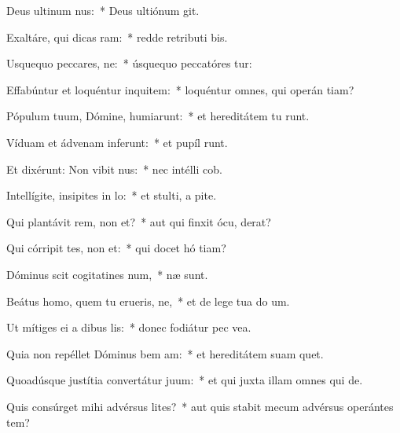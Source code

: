 \item Deus ultinum nus:~* Deus ultiónum  git.
\item Exaltáre, qui dicas ram:~* redde retributi bis.
\item Usquequo peccares, ne:~* úsquequo peccatóres tur:
\item Effabúntur et loquéntur inquitem:~* loquéntur omnes, qui operán tiam?
\item Pópulum tuum, Dómine, humiarunt:~* et hereditátem tu runt.
\item Víduam et ádvenam inferunt:~* et pupíl runt.
\item Et dixérunt: Non vibit nus:~* nec intélli  cob.
\item Intellígite, insipites in lo:~* et stulti, a pite.
\item Qui plantávit rem, non et?~* aut qui finxit ócu,  derat?
\item Qui córripit tes, non et:~* qui docet hó tiam?
\item Dóminus scit cogitatines num,~*  næ sunt.
\item Beátus homo, quem tu erueris, ne,~* et de lege tua do um.
\item Ut mítiges ei a dibus lis:~* donec fodiátur pec vea.
\item Quia non repéllet Dóminus bem am:~* et hereditátem suam  quet.
\item Quoadúsque justítia convertátur  juum:~* et qui juxta illam omnes qui   de.
\item Quis consúrget mihi advérsus lites?~* aut quis stabit mecum advérsus operántes tem?
